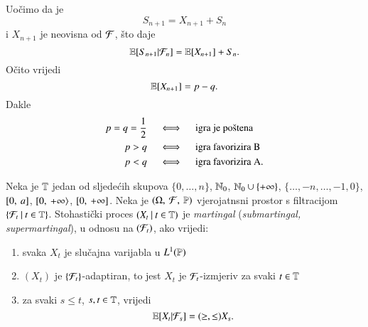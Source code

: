 \begin{pr}
    Uo\v cimo da je
    \begin{equation*}
        S_{n + 1} = X_{n + 1} + S_n
    \end{equation*}
    i $X_{n + 1}$ je neovisna od $\mathcal{F}$, \v sto daje
    \begin{equation*}
        \mathbb{E} [S_{n + 1} | \mathcal{F}_n] = \mathbb{E} [X_{n + 1}] + S_n.
    \end{equation*}
    O\v cito vrijedi
    \begin{equation*}
        \mathbb{E} [X_{n + 1}] = p - q.
    \end{equation*}
    Dakle
    \begin{equation}    \label{jed:23.3}
        \begin{aligned}
            p = q = \frac{1}{2} \quad &\iff \quad \textnormal{igra je po\v stena}\\
            p > q \quad &\iff \quad \textnormal{igra favorizira B}\\
            p < q \quad &\iff \quad \textnormal{igra favorizira A}.
        \end{aligned}
    \end{equation}
\end{pr}

\begin{defn}    \label{defn:23.4}
    Neka je $\mathbb{T}$ jedan od sljede\' cih skupova $\{ 0, \ldots, n \}$, $\mathbb{N}_0$, $\mathbb{N}_0 \cup \{+\infty\}$, $\{ \ldots, -n, \ldots, -1, 0\}$, $[{0}, \:{a}]$, $[ {0}, \: {+\infty} \rangle$, $[{0}, \:{+\infty}]$.
    Neka je $(\Omega, \: \mathcal{F}, \: \mathbb{P})$ vjerojatnsni prostor s filtracijom $\{{\mathcal{F}_t} \: | \: {t \in \mathbb{T}}\}$.
    Stohasti\v cki proces $({X_t} \: | \: {t \in \mathbb{T}})$ je \emph{martingal} (\emph{submartingal, supermartingal}), u odnosu na $(\mathcal{F}_t)$, ako vrijedi:
    \begin{enumerate}[label=(\alph*)]
        \item   \label{defn:23.4.1}
        svaka $X_t$ je slu\v cajna varijabla u $L^1 (\mathbb{P})$
        \item   \label{defn:23.4.2}
        $(X_t)$ je $\{\mathcal{F}_t\}$-adaptiran, to jest $X_t$ je $\mathcal{F}_t$-izmjeriv za svaki $t \in \mathbb{T}$
        \item   \label{defn:23.4.3}
        za svaki $s \leq t$, $s, t \in \mathbb{T}$, vrijedi
        \begin{equation*}
            \mathbb{E} [X_t | \mathcal{F}_s] = (\geq, \leq ) X_s.
        \end{equation*}
    \end{enumerate}
\end{defn}

